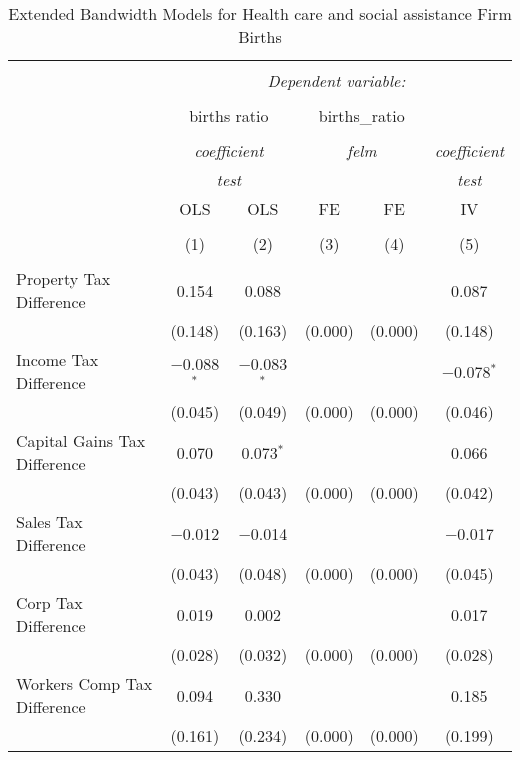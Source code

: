 
\begin{table}[!htbp] \centering 
  \caption{Extended Bandwidth Models for  Health care and social assistance Firm Births} 
  \label{} 
\begin{tabular}{@{\extracolsep{5pt}}lccccc} 
\\[-1.8ex]\hline 
\hline \\[-1.8ex] 
 & \multicolumn{5}{c}{\textit{Dependent variable:}} \\ 
\cline{2-6} 
\\[-1.8ex] & \multicolumn{2}{c}{births ratio} & \multicolumn{2}{c}{births\_ratio} &   \\ 
\\[-1.8ex] & \multicolumn{2}{c}{\textit{coefficient}} & \multicolumn{2}{c}{\textit{felm}} & \textit{coefficient} \\ 
 & \multicolumn{2}{c}{\textit{test}} & \multicolumn{2}{c}{\textit{}} & \textit{test} \\ 
 & OLS & OLS & FE & FE & IV \\ 
\\[-1.8ex] & (1) & (2) & (3) & (4) & (5)\\ 
\hline \\[-1.8ex] 
 Property Tax Difference & 0.154 & 0.088 &  &  & 0.087 \\ 
  & (0.148) & (0.163) & (0.000) & (0.000) & (0.148) \\ 
  Income Tax Difference & $-$0.088$^{*}$ & $-$0.083$^{*}$ &  &  & $-$0.078$^{*}$ \\ 
  & (0.045) & (0.049) & (0.000) & (0.000) & (0.046) \\ 
  Capital Gains Tax Difference & 0.070 & 0.073$^{*}$ &  &  & 0.066 \\ 
  & (0.043) & (0.043) & (0.000) & (0.000) & (0.042) \\ 
  Sales Tax Difference & $-$0.012 & $-$0.014 &  &  & $-$0.017 \\ 
  & (0.043) & (0.048) & (0.000) & (0.000) & (0.045) \\ 
  Corp Tax Difference & 0.019 & 0.002 &  &  & 0.017 \\ 
  & (0.028) & (0.032) & (0.000) & (0.000) & (0.028) \\ 
  Workers Comp Tax Difference & 0.094 & 0.330 &  &  & 0.185 \\ 
  & (0.161) & (0.234) & (0.000) & (0.000) & (0.199) \\ 

\end{tabular}
\end{table}
